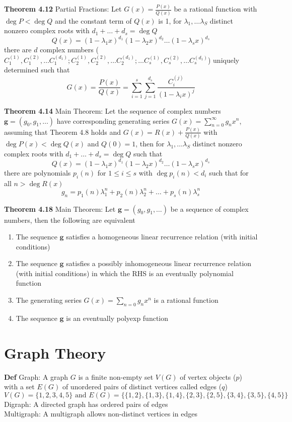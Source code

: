 \documentclass[11pt,notitlepage]{report}
\newcommand{\tbf}[1]{\textbf{#1}}
\begin{document}
\tbf{Theorem 4.12} Partial Fractions: Let $G(x) = \frac{P(x)}{Q(x)}$ be a rational function with $\deg P < \deg Q$ and the constant term of $Q(x)$ is 1, for $\lambda_1, \dots \lambda_S$ distinct nonzero complex roots with $d_1 + \dots + d_s = \deg Q$
$$Q(x) = (1-\lambda_1 x)^{d_1}(1-\lambda_2 x)^{d_2}\dots (1-\lambda_s x)^{d_s}$$
there are $d$ complex numbers ($C_1^{(1)}, C_1^{(2)}, \dots C_1^{(d_1)}; C_2^{(1)}, C_2^{(2)}, \dots C_2^{(d_1)}; \dots C_s^{(1)}, C_s^{(2)}, \dots C_s^{(d_1)}$) uniquely determined such that
$$G(x) = \frac{P(x)}{Q(x)} = \sum_{i=1}^s \sum ^{d_s}_{j=1} \frac{C_i^{(j)}}{(1 - \lambda_i x)^j}$$

\newpage
\tbf{Theorem 4.14} Main Theorem: Let the sequence of complex numbers $\tbf{g} = (g_0, g_1, \dots)$ have corresponding generating series $G(x) = \sum_{n=0}^\infty g_nx^n$, assuming that Theorem 4.8 holds and $G(x) = R(x) + \frac{P(x)}{Q(x)}$ with $\deg P(x) < \deg Q(x)$ and $Q(0) = 1$, then for $\lambda_1, \dots \lambda_S$ distinct nonzero complex roots with $d_1 + \dots + d_s = \deg Q$ such that
$$Q(x) = (1-\lambda_1 x)^{d_1}(1-\lambda_2 x)^{d_2}\dots (1-\lambda_s x)^{d_s}$$
there are polynomials $p_i(n)$ for $1 \leq i \leq s$ with $\deg p_i(n) < d_i$ such that for all $n > \deg R(x)$
$$g_n = p_1(n) \lambda_1^n + p_2(n) \lambda_2^n + \dots + p_s(n) \lambda_s^n$$

\tbf{Theorem 4.18} Main Theorem: Let $\tbf{g} = (g_0, g_1, \dots)$ be a sequence of complex numbers, then the following are equivalent
\begin{enumerate}[label=\alph*)]
    \item The sequence $\tbf{g}$ satisfies a homogeneous linear recurrence relation (with initial conditions)
    \item The sequence $\tbf{g}$ satisfies a possibly inhomogeneous linear recurrence relation (with initial conditions) in which the RHS is an eventually polynomial function
    \item The generating series $G(x) = \sum_{n=0} g_nx^n$ is a rational function
    \item The sequence $\tbf{g}$ is an eventually polyexp function
\end{enumerate}

\newpage
\section{Graph Theory}

\tbf{Def} Graph: A graph $G$ is a finite non-empty set $V(G)$ of vertex objects ($p$) with a set $E(G)$ of unordered pairs of distinct vertices called edges ($q$) 
$$V(G) = \{1, 2, 3, 4, 5\} \text{ and } E(G) = \{\{1, 2\}, \{1, 3\}, \{1, 4\}, \{2, 3\}, \{2, 5\}, \{3, 4\}, \{3, 5\}, \{4, 5\}\}$$
\hspace*{5mm} Digraph: A directed graph has ordered pairs of edges \\
\hspace*{5mm} Multigraph: A multigraph allows non-distinct vertices in edges 
\end{document}

